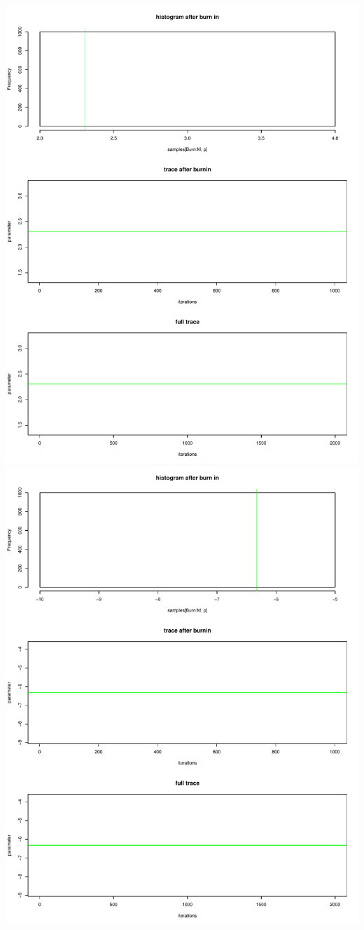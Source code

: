 \documentclass[a4paper,12pt]{scrartcl} %
\begin{document}
\clearpage
\includegraphics[scale=0.4]{9}  %
\includegraphics[scale=0.4]{10}
\end{document}
